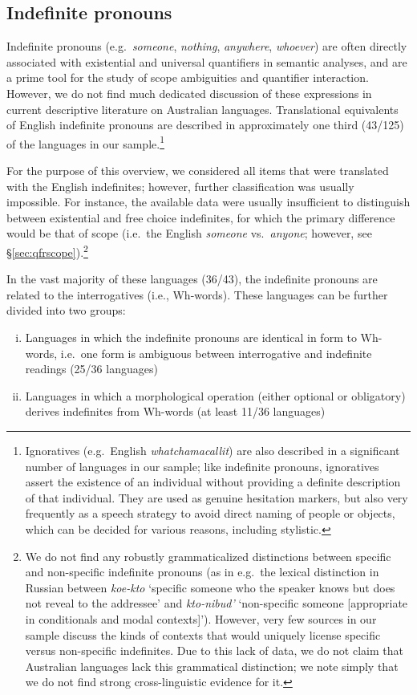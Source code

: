 \documentclass[12pt,egregdoesnotlikesansseriftitles]{scrartcl}
\newcommand{\ofy}{/125} %
\begin{document}
\subsection{Indefinite pronouns}
\label{sec:indefs}
Indefinite pronouns (e.g.\ \textit{someone}, \textit{nothing}, \textit{anywhere}, \textit{whoever}) are often directly associated with existential and universal quantifiers in semantic analyses, and are a prime tool for the study of scope ambiguities and quantifier interaction. However, we do not find much dedicated discussion of these expressions in current descriptive literature on Australian languages. Translational equivalents of English indefinite pronouns  are described in approximately one third (43\ofy) of the languages in our sample.\footnote{Ignoratives (e.g.\ English \textit{whatchamacallit}) are also described in a significant number of languages in our sample; like indefinite pronouns, ignoratives assert the existence of an individual without providing a definite description of that individual. They are used as genuine hesitation markers, but also very frequently as a speech strategy to avoid direct naming of people or objects, which can be decided for various reasons, including stylistic.}

For the purpose of this overview, we considered all items that were translated with the English indefinites; however, further classification was usually impossible. For instance, the available data were usually insufficient to distinguish between existential and free choice indefinites, for which the primary difference would be that of scope (i.e.\ the English \textit{someone} vs.\ \textit{anyone}; however, see \S\ref{sec:qfrscope}).\footnote{We do not find any robustly grammaticalized distinctions between specific and non-specific indefinite pronouns (as in e.g.\ the lexical distinction in Russian between \textit{koe-kto} `specific someone who the speaker knows but does not reveal to the addressee' and \textit{kto-nibud'} `non-specific someone [appropriate in conditionals and modal contexts]'). However, very few sources in our sample discuss the kinds of contexts that would uniquely license specific versus non-specific indefinites. Due to this lack of data, we do not claim that Australian languages lack this grammatical distinction; we note simply that we do not find strong cross-linguistic evidence for it.}

In the vast majority of these languages (36/43), the indefinite pronouns are related to the interrogatives (i.e., Wh-words).
These languages can be further divided into two groups:
\begin{enumerate}[(i)]
\item Languages in which the indefinite pronouns are identical in form to Wh-words, i.e.\ one form is ambiguous between interrogative and indefinite readings (25/36 languages) %
\item Languages in which a morphological operation (either optional or obligatory) derives indefinites from Wh-words (at least 11/36 languages)
\end{enumerate}
\end{document}
